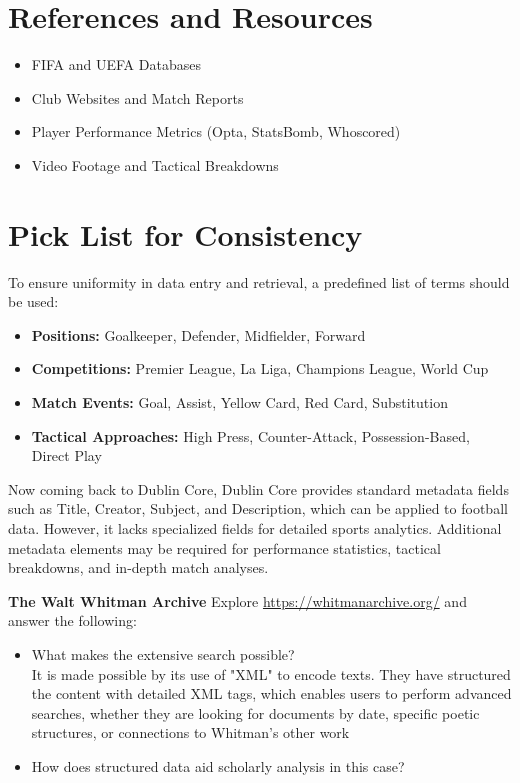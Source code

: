 \documentclass[a4paper]{exam}
\begin{document}
\begin{questions}
\section*{References and Resources}
\begin{itemize}
    \item FIFA and UEFA Databases
    \item Club Websites and Match Reports
    \item Player Performance Metrics (Opta, StatsBomb, Whoscored)
    \item Video Footage and Tactical Breakdowns
\end{itemize}

\section*{Pick List for Consistency}
To ensure uniformity in data entry and retrieval, a predefined list of terms should be used:
\begin{itemize}
    \item \textbf{Positions:} Goalkeeper, Defender, Midfielder, Forward
    \item \textbf{Competitions:} Premier League, La Liga, Champions League, World Cup
    \item \textbf{Match Events:} Goal, Assist, Yellow Card, Red Card, Substitution
    \item \textbf{Tactical Approaches:} High Press, Counter-Attack, Possession-Based, Direct Play
\end{itemize}

Now coming back to Dublin Core, Dublin Core provides standard metadata fields such as Title, Creator, Subject, and Description, which can be applied to football data. However, it lacks specialized fields for detailed sports analytics. Additional metadata elements may be required for performance statistics, tactical breakdowns, and in-depth match analyses.


\vspace{6cm}

\question[10] \textbf{The Walt Whitman Archive} Explore \url{https://whitmanarchive.org/} and answer the following: 
\begin{itemize}
    \item What makes the extensive search possible?
    \\
    
    It is made possible by its use of "XML" to encode texts. They have structured the content with detailed XML tags, which enables users to perform advanced searches, whether they are looking for documents by date, specific poetic structures, or connections to Whitman’s other work
    \item How does structured data aid scholarly analysis in this case?
    \\


\end{itemize}
\end{questions}
\end{document}
